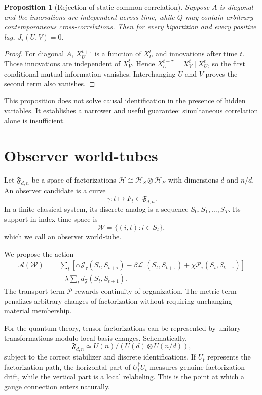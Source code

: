 \documentclass[11pt]{article}
\newtheorem{proposition}{Proposition}
\newcommand{\Hspace}{\mathcal H}
\begin{document}
\begin{proposition}[Rejection of static common correlation]
Suppose $A$ is diagonal and the innovations are independent across time, while
$Q$ may contain arbitrary contemporaneous cross-correlations. Then for every
bipartition and every positive lag, $J_\tau(U,V)=0$.
\end{proposition}

\begin{proof}
For diagonal $A$, $X_U^{t+\tau}$ is a function of $X_U^t$ and innovations after
time $t$. Those innovations are independent of $X_V^t$. Hence
$X_U^{t+\tau}\perp X_V^t\mid X_U^t$, so the first conditional mutual
information vanishes. Interchanging $U$ and $V$ proves the second term also
vanishes.
\end{proof}

This proposition does not solve causal identification in the presence of hidden
variables. It establishes a narrower and useful guarantee: simultaneous
correlation alone is insufficient.

\section{Observer world-tubes}

Let $\mathfrak F_{d,n}$ be a space of factorizations
$\Hspace\cong\Hspace_S\otimes\Hspace_E$ with dimensions $d$ and $n/d$.
An observer candidate is a curve
\begin{equation}
\gamma:t\longmapsto F_t\in\mathfrak F_{d,n}.
\end{equation}
In a finite classical system, its discrete analog is a sequence
$S_0,S_1,\ldots,S_T$. Its support in index-time space is
\begin{equation}
\mathcal W=\{(i,t):i\in S_t\},
\end{equation}
which we call an observer world-tube.

We propose the action
\begin{align}
\mathcal A(\mathcal W)
=&\sum_t\left[
\alpha\mathcal J_\tau(S_t,S_{t+\tau})
-\beta\mathcal L_\tau(S_t,S_{t+\tau})
+\chi\mathcal P_\tau(S_t,S_{t+\tau})
\right]\\
&-\lambda\sum_t d_{\mathfrak F}(S_t,S_{t+1}).
\end{align}
The transport term $\mathcal P$ rewards continuity of organization. The metric
term penalizes arbitrary changes of factorization without requiring unchanging
material membership.

For the quantum theory, tensor factorizations can be represented by unitary
transformations modulo local basis changes. Schematically,
\begin{equation}
\mathfrak F_{d,n}\simeq
U(n)/\left(U(d)\otimes U(n/d)\right),
\end{equation}
subject to the correct stabilizer and discrete identifications. If $U_t$
represents the factorization path, the horizontal part of
$U_t^\dagger\dot U_t$ measures genuine factorization drift, while the vertical
part is a local relabeling. This is the point at which a gauge connection enters
naturally.
\end{document}
